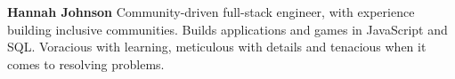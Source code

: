 \documentclass[10.5pt, oneside]{memoir}
\begin{document}
\begin{minipage}[t][0.6in][b]{5in}
    {\fontsize{34pt}{40pt}\selectfont
        \rmfamily\textbf{Hannah Johnson}}
    \vfill
    Community-driven full-stack engineer, with experience building inclusive
    communities. Builds applications and games in JavaScript and SQL. Voracious
    with learning, meticulous with details and tenacious when it comes to
    resolving
    problems.

\end{minipage}
\end{document}
